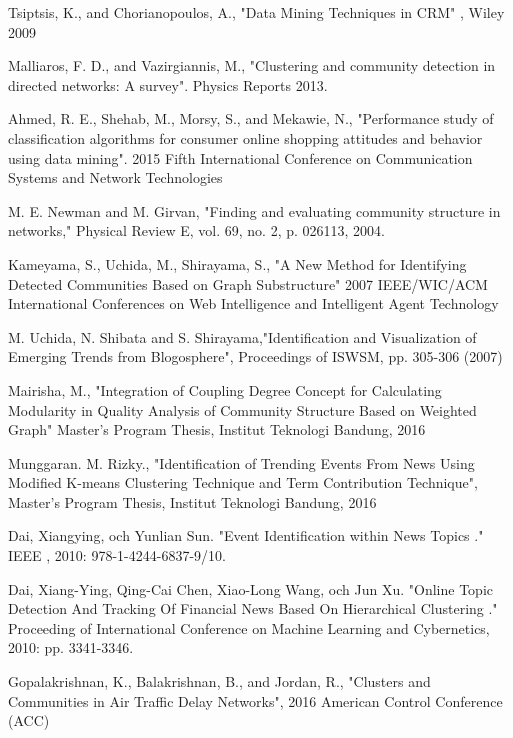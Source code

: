 \documentclass[conference]{IEEEtran}
\begin{document}
\begin{thebibliography}{1}


Tsiptsis, K., and Chorianopoulos, A., "Data Mining Techniques in CRM" , Wiley 2009

Malliaros, F. D., and Vazirgiannis, M., "Clustering and community detection in directed networks: A survey". Physics Reports 2013.

Ahmed, R. E., Shehab, M., Morsy, S., and Mekawie, N., "Performance study of classification algorithms for consumer online shopping attitudes and behavior using data mining". 2015 Fifth International Conference on Communication Systems and Network Technologies

M. E. Newman and M. Girvan, "Finding and evaluating
community structure in networks," Physical Review E,
vol. 69, no. 2, p. 026113, 2004.

Kameyama, S., Uchida, M., Shirayama, S., "A New Method for Identifying Detected Communities Based on Graph Substructure" 2007 IEEE/WIC/ACM International Conferences on Web Intelligence and Intelligent Agent Technology

M. Uchida, N. Shibata and S. Shirayama,"Identification and Visualization of Emerging Trends from Blogosphere", Proceedings of ISWSM, pp. 305-306 (2007)

Mairisha, M., "Integration of Coupling Degree Concept for Calculating Modularity in Quality Analysis of
Community Structure Based on Weighted Graph" Master’s Program Thesis, Institut Teknologi Bandung, 2016

Munggaran. M. Rizky., "Identification of Trending Events From News Using Modified K-means Clustering Technique and Term Contribution Technique", Master’s Program Thesis, Institut Teknologi Bandung, 2016

Dai, Xiangying, och Yunlian Sun. "Event Identification within News Topics ." IEEE ,
2010: 978-1-4244-6837-9/10.

Dai, Xiang-Ying, Qing-Cai Chen, Xiao-Long Wang, och Jun Xu. "Online Topic
Detection And Tracking Of Financial News Based On Hierarchical Clustering ."
Proceeding of International Conference on Machine Learning and Cybernetics,
2010: pp. 3341-3346.

Gopalakrishnan, K., Balakrishnan, B., and Jordan, R., "Clusters and Communities in Air Traffic Delay Networks", 2016 American Control Conference (ACC)


\end{thebibliography}
\end{document}
